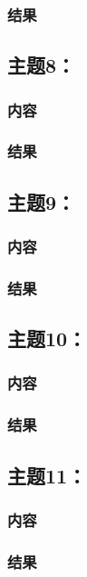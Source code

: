 \documentclass{article}
\begin{document}
\subsubsection{结果}  
\newpage
\thispagestyle{empty}
\subsection{主题8：}  
\subsubsection{内容}
\subsubsection{结果}  
\vspace{1cm}
\subsection{主题9：}  
\subsubsection{内容}
\subsubsection{结果}  
\vspace{1cm}
\subsection{主题10：}  
\subsubsection{内容}
\subsubsection{结果}  
\vspace{1cm}
\subsection{主题11：}  
\subsubsection{内容}
\subsubsection{结果}  
\vspace{1cm}
\end{document}
